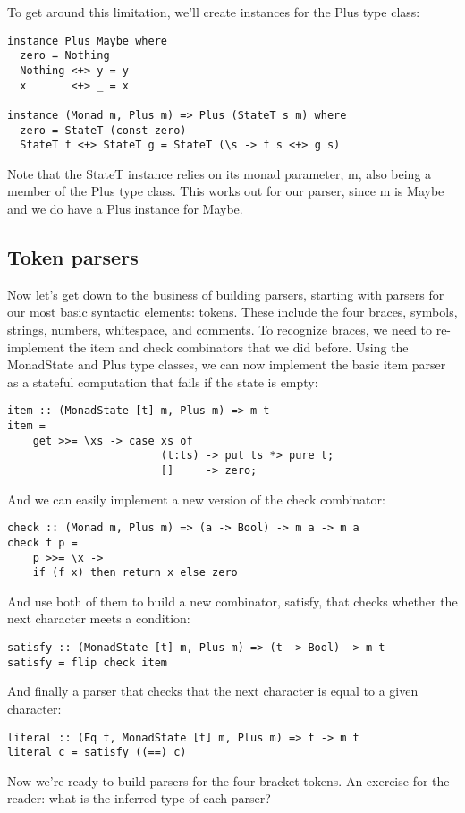 \documentclass{tmr}
\begin{document}
To get around this limitation, we'll create instances for the Plus type class:
\begin{verbatim}
instance Plus Maybe where
  zero = Nothing
  Nothing <+> y = y
  x       <+> _ = x

instance (Monad m, Plus m) => Plus (StateT s m) where
  zero = StateT (const zero)
  StateT f <+> StateT g = StateT (\s -> f s <+> g s)
\end{verbatim}
Note that the StateT instance relies on its monad parameter, m, also being a 
member of the Plus type class.  This works out for our parser, since m is Maybe
and we do have a Plus instance for Maybe.

\subsection{Token parsers}
Now let's get down to the business of building parsers, starting with parsers
for our most basic syntactic elements:  tokens.
These include the four braces, symbols, strings, numbers, whitespace, and comments.
To recognize braces, we need to re-implement the item and check combinators that
we did before.  Using the MonadState and Plus type classes, 
we can now implement the basic item parser as a stateful
computation that fails if the state is empty:
\begin{verbatim}
item :: (MonadState [t] m, Plus m) => m t
item =
    get >>= \xs -> case xs of
                        (t:ts) -> put ts *> pure t;
                        []     -> zero;
\end{verbatim}
And we can easily implement a new version of the check combinator:
\begin{verbatim}
check :: (Monad m, Plus m) => (a -> Bool) -> m a -> m a
check f p =
    p >>= \x ->
    if (f x) then return x else zero
\end{verbatim}
And use both of them to build a new combinator, satisfy, that checks whether
the next character meets a condition:
\begin{verbatim}
satisfy :: (MonadState [t] m, Plus m) => (t -> Bool) -> m t
satisfy = flip check item
\end{verbatim}
And finally a parser that checks that the next character is equal to a
given character:
\begin{verbatim}
literal :: (Eq t, MonadState [t] m, Plus m) => t -> m t
literal c = satisfy ((==) c)
\end{verbatim}
Now we're ready to build parsers for the four bracket tokens.  
An exercise for the reader:  what is the inferred type of each parser?
\end{document}
